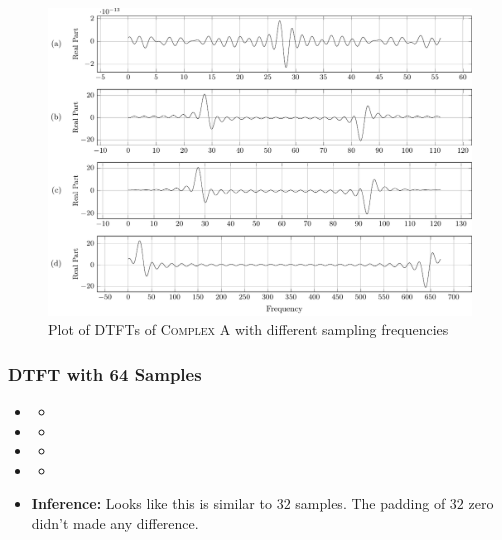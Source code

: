 \documentclass[../../course]{subfiles}
\begin{document}
\begin{figure} [H]
    \centering
     {
        \includegraphics[height = 0.8\textheight] {tikzpics/plotDtftComplexA32.pdf}
    }
     {Plot of \textsc{DTFT}s of \textsc{Complex A} with different sampling frequencies}
    \label{plt:dtftComplexA}
\end{figure}

\subsubsection{DTFT with 64 Samples}

\begin{itemize} [label=]

    \item \sampFreqMuchLess
        \begin{itemize} [label=]
            \item
        \end{itemize}

    \item \sampFreqNorm
        \begin{itemize} [label=]
            \item
        \end{itemize}

    \item \sampFreqSligGreat
        \begin{itemize} [label=]
            \item
        \end{itemize}

    \item \sampFreqMuchGreat
        \begin{itemize} [label=]
            \item
        \end{itemize}

    \item \textbf{Inference:} Looks like this is similar to $32$ samples. The padding of $32$
        zero didn't made any difference.

\end{itemize}
\end{document}
